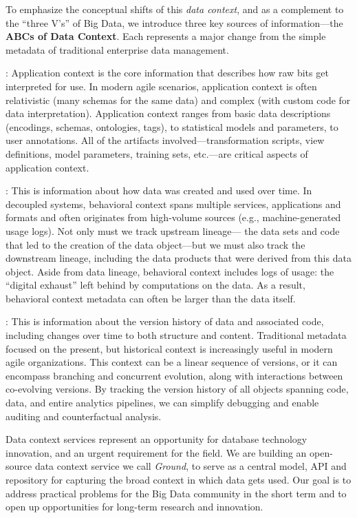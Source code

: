 \documentclass{sig-alternate}
\begin{document}
To emphasize the conceptual shifts of this \emph{data context}, and as a complement to the ``three V's'' of Big Data,
we introduce three key sources of information---the \textbf{ABCs of Data Context}. Each represents a major change from the simple metadata of traditional enterprise data management.

: Application context is the core information that describes how raw bits get interpreted for use. 
In modern agile scenarios, application context is often relativistic (many schemas for the same data) and complex (with custom code for data interpretation). 
Application context ranges from basic data descriptions (encodings, schemas, ontologies, tags), to statistical models and parameters, to user annotations.  
All of the artifacts involved---transformation scripts, view definitions, model parameters, training sets, etc.---are critical aspects of application context. 

: This is information about how data was created and used over time. 
In decoupled systems, behavioral context spans multiple services, applications and formats and often originates from high-volume sources (e.g., machine-generated usage logs).
Not only must we track upstream lineage---
the data sets and code that led to the creation of the data object---but we must also track the 
downstream lineage, including the data products that were derived from this data object. 
Aside from data lineage, behavioral context includes logs of usage: the ``digital exhaust'' left behind by computations on the data. 
As a result, behavioral context metadata can 
often be larger than the data itself. 

:
This is information about the version history of data and associated code, including changes over time to both structure and content. 
Traditional metadata focused on the present, but historical context is increasingly useful in modern agile organizations.
This context can be a linear sequence of versions, or it can encompass branching and concurrent evolution, along with interactions 
between co-evolving versions.
By tracking the version history of all objects spanning code, data, and entire analytics pipelines, we can simplify debugging and enable auditing and counterfactual analysis. 

\smallitembot
Data context services represent an opportunity for database technology innovation, and an urgent requirement for the field.
We are building an open-source data context service we call \emph{Ground}, to serve as a central model, API and repository for capturing the broad context in which data gets used. 
Our goal is to address practical problems for the Big Data community in the short term and to open up opportunities for long-term research and innovation.
\end{document}
